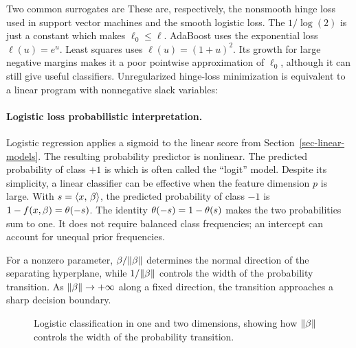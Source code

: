 Two common surrogates are
These are, respectively, the nonsmooth hinge loss used in support vector machines and the smooth logistic loss. The $1/\log(2)$ is just a constant which makes $\ell_0 \leq \ell$.
% 
AdaBoost uses the exponential loss $\ell(u)=e^u$.
%
Least squares uses $\ell(u)=(1+u)^2$. Its growth for large negative margins makes it a poor pointwise approximation of $\ell_0$, although it can still give useful classifiers.
% 
Unregularized hinge-loss minimization is equivalent to a linear program with nonnegative slack variables:


\paragraph{Logistic loss probabilistic interpretation.}

Logistic regression applies a sigmoid to the linear score from Section~\ref{sec-linear-models}. The resulting probability predictor is nonlinear. The predicted probability of class $+1$ is
which is often called the ``logit'' model.
%
Despite its simplicity, a linear classifier can be effective when the feature dimension $p$ is large.
%
With $s=\langle x,\,\beta\rangle$, the predicted probability of class $-1$ is $1-f(x,\beta)=\theta(-s)$. The identity $\theta(-s)=1-\theta(s)$ makes the two probabilities sum to one. It does not require balanced class frequencies; an intercept can account for unequal prior frequencies.

For a nonzero parameter, $\beta/\lVert\beta\rVert$ determines the normal direction of the separating hyperplane, while $1/\lVert\beta\rVert$ controls the width of the probability transition. As $\lVert\beta\rVert \rightarrow +\infty$ along a fixed direction, the transition approaches a sharp decision boundary.

\begin{figure}[tbp]
\centering
{}\hfill
{}
\caption{Logistic classification in one and two dimensions, showing how $\lVert\beta\rVert$ controls the width of the probability transition.}
\label{fig-logistic-sharpness}
\end{figure}

